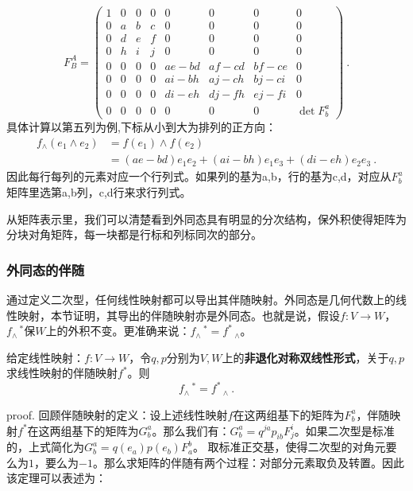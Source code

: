 \begin{equation}
F_B^A=\left(\begin{array}{cccccccc}
1 & 0 & 0 & 0 & 0 & 0 & 0 & 0 \\
0 & a & b & c & 0 & 0 & 0 & 0 \\
0 & d & e & f & 0 & 0 & 0 & 0 \\
0 & h & i & j & 0 & 0 & 0 & 0 \\
0 & 0 & 0 & 0 & a e-b d & a f-c d & b f-c e & 0 \\
0 & 0 & 0 & 0 & a i-b h & a j-c h & b j-c i & 0 \\
0 & 0 & 0 & 0 & d i-e h & d j-f h & e j-f i & 0 \\
0 & 0 & 0 & 0 & 0 & 0 & 0 & \operatorname{det} F_b^a
\end{array}\right) ~.
\end{equation}
具体计算以第五列为例,下标从小到大为排列的正方向：
\begin{equation}
\begin{aligned}
f_\wedge(e_1\wedge e_2)&=f(e_1)\wedge f(e_2)\\
&=(a e-b d)e_1 e_2+(a i-b h)e_1 e_3+ (d i-e h)e_2 e_3~.
\end{aligned}
\end{equation}
因此每行每列的元素对应一个行列式。如果列的基为a,b，行的基为c,d，对应从$F^a_b$矩阵里选第a,b列，c,d行来求行列式。

从矩阵表示里，我们可以清楚看到外同态具有明显的分次结构，保外积使得矩阵为分块对角矩阵，每一块都是行标和列标同次的部分。
\subsubsection{外同态的伴随}
通过定义二次型，任何线性映射都可以导出其伴随映射。外同态是几何代数上的线性映射，本节证明，其导出的伴随映射亦是外同态。也就是说，假设$f:V\rightarrow W$，$f_{\wedge}\,^*$保$W$上的外积不变。更准确来说：$f_{\wedge}\,^*=f^*\,_{\wedge}$。

\begin{theorem}{}
给定线性映射：$f:V\rightarrow W$，令$q,p$分别为$V,W$上的\textbf{非退化对称双线性形式}，关于$q,p$求线性映射的伴随映射$f^*$。则
\begin{equation}
f_{\wedge}\,^*=f^*\,_{\wedge}~.
\end{equation}
\end{theorem}
proof.
回顾伴随映射的定义：设上述线性映射$f$在这两组基下的矩阵为$F^a_b$，伴随映射$f^*$在这两组基下的矩阵为$G^a_b$。那么我们有：$G^a_b =q^{ja}p_{ib}F^i_j$。如果二次型是标准的，上式简化为$G^a_b=q(e_a)p(e_b)F^b_a$。
取标准正交基，使得二次型的对角元要么为$1$，要么为$-1$。那么求矩阵的伴随有两个过程：对部分元素取负及转置。因此该定理可以表述为：

